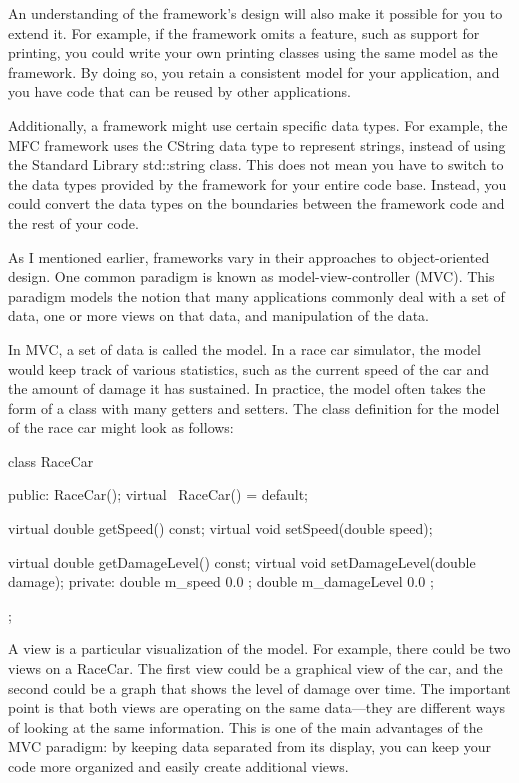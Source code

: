 An understanding of the framework’s design will also make it possible for you to extend it. For example, if the framework omits a feature, such as support for printing, you could write your own printing classes using the same model as the framework. By doing so, you retain a consistent model for your application, and you have code that can be reused by other applications.

Additionally, a framework might use certain specific data types. For example, the MFC framework uses the CString data type to represent strings, instead of using the Standard Library std::string class. This does not mean you have to switch to the data types provided by the framework for your entire code base. Instead, you could convert the data types on the boundaries between the framework code and the rest of your code.


As I mentioned earlier, frameworks vary in their approaches to object-oriented design. One common paradigm is known as model-view-controller (MVC). This paradigm models the notion that many applications commonly deal with a set of data, one or more views on that data, and manipulation of the data.

In MVC, a set of data is called the model. In a race car simulator, the model would keep track of various statistics, such as the current speed of the car and the amount of damage it has sustained. In practice, the model often takes the form of a class with many getters and setters. The class definition for the model of the race car might look as follows:

\begin{cpp}
class RaceCar
{
    public:
        RaceCar();
        virtual ~RaceCar() = default;

        virtual double getSpeed() const;
        virtual void setSpeed(double speed);

        virtual double getDamageLevel() const;
        virtual void setDamageLevel(double damage);
    private:
        double m_speed { 0.0 };
        double m_damageLevel { 0.0 };
};
\end{cpp}

A view is a particular visualization of the model. For example, there could be two views on a RaceCar. The first view could be a graphical view of the car, and the second could be a graph that shows the level of damage over time. The important point is that both views are operating on the same data—they are different ways of looking at the same information. This is one of the main advantages of the MVC paradigm: by keeping data separated from its display, you can keep your code more organized and easily create additional views.

